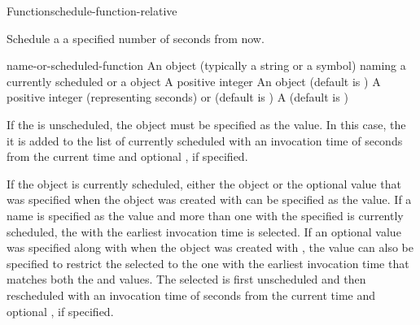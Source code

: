 \documentclass[10pt,twoside,english,pdftex]{article}
\begin{document}
\begin{functiondoc}{Function}{schedule-function-relative}%
  { 
    }
%
%
%

\fnsyntax

\fnpurpose Schedule a  a specified number of
seconds from now.

\fnpackage {}

\fnmodule {}

\fnargs
\begin{args}{name-or-scheduled-function}
 An object (typically a string or a
  symbol) naming a currently scheduled  or a
   object
\arg[seconds] A positive integer
\arg[marker] An object (default is \nil)
 A positive integer (representing seconds) or
  \nil{} (default is \nil)
\arg[verbose] A 
  (default is )
\end{args}

\fnerrors
\nothreads{}

\fndescription If the  is unscheduled, the
 object must be specified as the
 value.  In this case, the
 it is added to the list of currently
scheduled  with an invocation time of
 seconds from the current time and optional
, if specified.

If the  object is currently scheduled, either
the  object or the optional  value
that was specified when the  object was
created with  can be
specified as the  value.  If a name
is specified as the  value and more
than one  with the specified  is
currently scheduled, the  with the earliest
invocation time is selected.  If an optional  value was
specified along with  when the 
object was created with , the
 value can also be specified to restrict the selected
 to the one with the earliest invocation time
that matches both the  and  values.  The selected
 is first unscheduled and then rescheduled
with an invocation time of  seconds from the current
time and optional , if specified.


\end{functiondoc}
\end{document}
